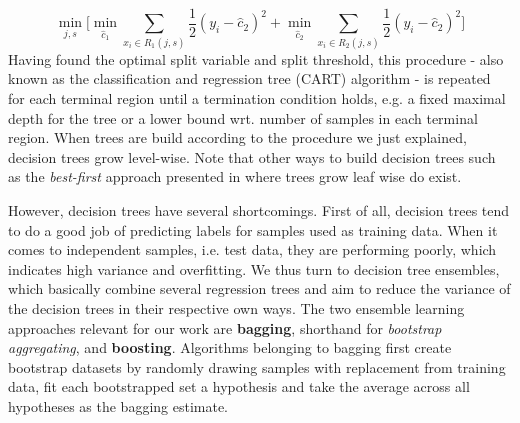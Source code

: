 \begin{equation}\label{minjs}
	\min_{j,s} \bigg [\min_{\hat{c}_1} \sum_{x_i \in R_1(j,s)} \dfrac{1}{2}(y_i - \hat{c}_{2})^2 + \min_{\hat{c}_2} \sum_{x_i \in R_{2}(j,s)} \dfrac{1}{2}(y_i - \hat{c}_{2})^2\bigg]
\end{equation}
Having found the optimal split variable and split threshold, this procedure - also known as the classification and regression tree (CART) algorithm - is repeated for each terminal region until a termination condition holds, e.g. a fixed maximal depth for the tree or a lower bound wrt. number of samples in each terminal region. When trees are build according to the procedure we just explained, decision trees grow level-wise. Note that other ways to build decision trees such as the \textit{best-first} approach presented in \cite{BestFirst} where trees grow leaf wise do exist. 

However, decision trees have several shortcomings. First of all, decision trees tend to do a good job of predicting labels for samples used as training data. When it comes to independent samples, i.e. test data, they are performing poorly, which indicates high variance and overfitting. We thus turn to  decision tree ensembles, which basically combine several regression trees and aim to reduce the variance of the decision trees in their respective own ways. 
The two ensemble learning approaches relevant for our work are \textbf{bagging}, shorthand for \textit{bootstrap aggregating}, and \textbf{boosting}. 
Algorithms belonging to bagging first create bootstrap datasets by randomly drawing samples with replacement from training data, fit each bootstrapped set a hypothesis and take the average across all hypotheses as the bagging estimate.

